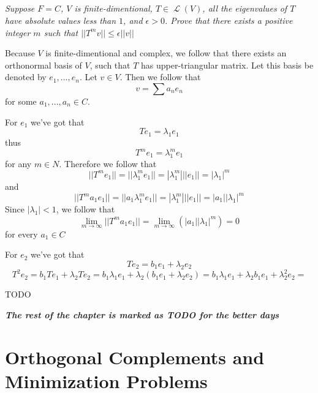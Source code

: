 \documentclass[11pt,oneside,titlepage]{book}
\DeclareMathOperator \map {\mathcal {L}}
\begin{document}
\subsection{}

\textit{Suppose $F = C$, $V$ is finite-dimentional, $T \in \map(V)$, all the eigenvalues of $T$
  have absolute values less than $1$, and $\epsilon > 0$. Prove that there exists a
  positive integer $m$ such that $||T^m v|| \leq \epsilon ||v||$}

Because $V$ is finite-dimentional and complex, we follow that
there exists an orthonormal basis of $V$, such that $T$ has upper-triangular matrix. Let
this basis be denoted by $e_1, ..., e_n$. Let $v \in V$. Then we follow that
$$v = \sum{a_n e_n}$$
for some $a_1, ..., a_n \in C$.

For $e_1$ we've got that
$$T e_1 = \lambda_1 e_1$$
thus
$$T^m e_1 = \lambda_1^m e_1$$
for any $m \in N$. Therefore we follow that
$$||T^m e_1|| = ||\lambda_1^m e_1|| = |\lambda_1^m| ||e_1|| = |\lambda_1|^m$$
and
$$||T^m a_1 e_1|| = ||a_1 \lambda_1^m e_1|| = |\lambda_1^m| ||e_1|| = |a_1| |\lambda_1|^m$$
Since $|\lambda_1| < 1$, we follow that
$$\lim_{m \to \infty}{||T^m a_1 e_1||} = \lim_{m \to \infty}{(|a_1| |\lambda_1|^m)}= 0$$
for every $a_1 \in C$

For $e_2$ we've got that
$$T e_2 = b_1 e_1 + \lambda_2 e_2$$
$$T^2 e_2 = b_1 T e_1 + \lambda_2 T e_2 = b_1 \lambda_1 e_1 + \lambda_2 (b_1 e_1 + \lambda_2 e_2) =
b_1 \lambda_1 e_1 + \lambda_2 b_1 e_1 + \lambda_2^2  e_2 = $$

TODO

\textbf{\textit{The rest of the chapter is marked as TODO for the better days}}

\section{Orthogonal Complements and Minimization Problems}
\end{document}
